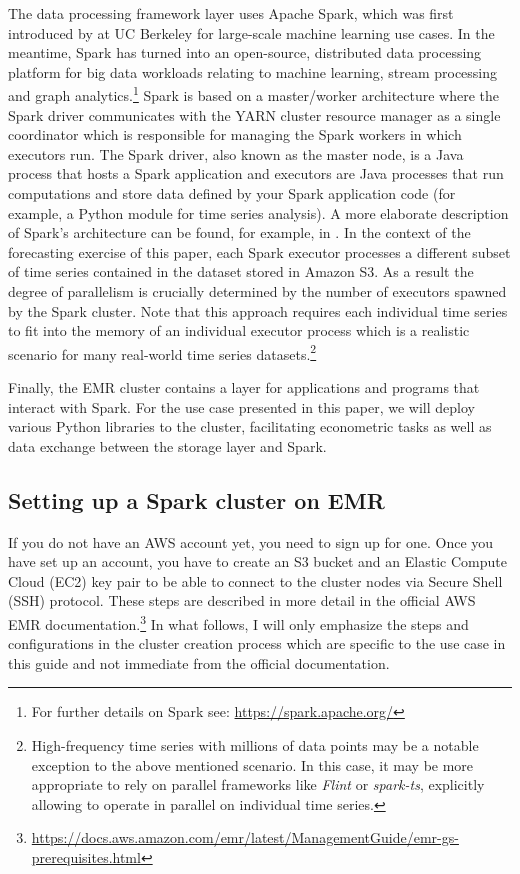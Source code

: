 \documentclass[11pt]{article}
\renewcommand{\cite}{\citet}
\begin{document}
The data processing framework layer uses Apache Spark, which was first introduced by \cite{Zaharia2010} at UC Berkeley for large-scale machine learning use cases. In the meantime, Spark has turned into an open-source, distributed data processing platform for big data workloads relating to machine learning, stream processing and graph analytics.\footnote{For further details on Spark see:  \url{https://spark.apache.org/}} Spark is based on a master/worker architecture where the Spark driver communicates with the YARN cluster resource manager as a single coordinator which is responsible for managing the Spark workers in which executors run. The Spark driver, also known as the master node, is a Java process that hosts a Spark application and executors are Java processes that run computations and store data defined by your Spark application code (for example, a Python module for time series analysis). A more elaborate description of Spark's architecture can be found, for example, in \cite{Chambers2018}. In the context of the forecasting exercise of this paper, each Spark executor processes a different subset of time series contained in the dataset stored in Amazon S3. As a result the degree of parallelism is crucially determined by the number of executors spawned by the Spark cluster. Note that this approach requires each individual time series to fit into the memory of an individual executor process which is a realistic scenario for many real-world time series datasets.\footnote{High-frequency time series with millions of data points may be a notable exception to the above mentioned scenario. In this case, it may be more appropriate to rely on parallel frameworks like \emph{Flint} or \emph{spark-ts}, explicitly allowing to operate in parallel on individual time series.}    

Finally, the EMR cluster contains a layer for applications and programs that interact with Spark. For the use case presented in this paper, we will deploy various Python libraries to the cluster, facilitating econometric tasks as well as data exchange between the storage layer and Spark. 

\subsection{Setting up a Spark cluster on EMR}
\label{sec:cluster_setup}

If you do not have an AWS account yet, you need to sign up for one. Once you have set up an account, you have to create an S3 bucket and an Elastic Compute Cloud (EC2) key pair to be able to connect to the cluster nodes via Secure Shell (SSH) protocol. These steps are described in more detail in the official AWS EMR documentation.\footnote{\url{https://docs.aws.amazon.com/emr/latest/ManagementGuide/emr-gs-prerequisites.html}} In what follows, I will only emphasize the steps and configurations in the cluster creation process which are specific to the use case in this guide and not immediate from the official documentation. 
\end{document}
